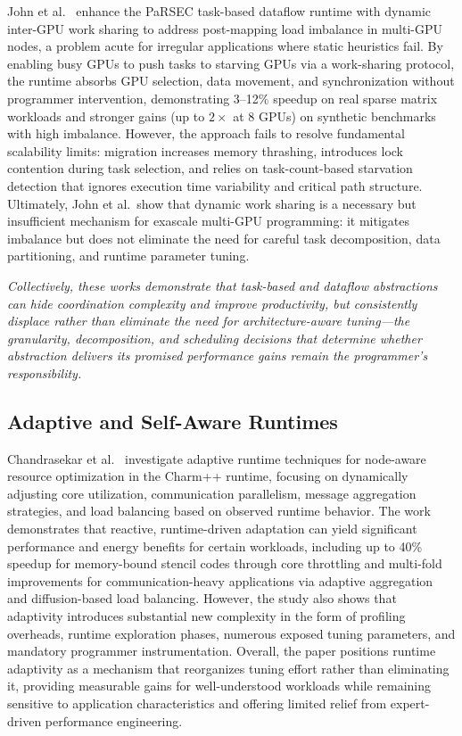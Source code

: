 John et al.~\cite{john2023multgpu} enhance the PaRSEC task-based dataflow
runtime with dynamic inter-GPU work sharing to address post-mapping load
imbalance in multi-GPU nodes, a problem acute for irregular applications where
static heuristics fail. By enabling busy GPUs to push tasks to starving GPUs
via a work-sharing protocol, the runtime absorbs GPU selection, data movement,
and synchronization without programmer intervention, demonstrating 3--12\%
speedup on real sparse matrix workloads and stronger gains (up to $2\times$ at
8 GPUs) on synthetic benchmarks with high imbalance. However, the approach
fails to resolve fundamental scalability limits: migration increases memory
thrashing, introduces lock contention during task selection, and relies on
task-count-based starvation detection that ignores execution time variability
and critical path structure. Ultimately, John et al.\ show that dynamic work
sharing is a necessary but insufficient mechanism for exascale multi-GPU
programming: it mitigates imbalance but does not eliminate the need for careful
task decomposition, data partitioning, and runtime parameter tuning.

\textit{Collectively, these works demonstrate that task-based and dataflow
abstractions can hide coordination complexity and improve productivity, but
consistently displace rather than eliminate the need for architecture-aware
tuning---the granularity, decomposition, and scheduling decisions that determine
whether abstraction delivers its promised performance gains remain the
programmer's responsibility.}

\subsection{Adaptive and Self-Aware Runtimes}

Chandrasekar et al.~\cite{chandrasekar2023adaptive} investigate adaptive runtime
techniques for node-aware resource optimization in the Charm++ runtime, focusing
on dynamically adjusting core utilization, communication parallelism, message
aggregation strategies, and load balancing based on observed runtime behavior.
The work demonstrates that reactive, runtime-driven adaptation can yield
significant performance and energy benefits for certain workloads, including up
to 40\% speedup for memory-bound stencil codes through core throttling and
multi-fold improvements for communication-heavy applications via adaptive
aggregation and diffusion-based load balancing. However, the study also shows
that adaptivity introduces substantial new complexity in the form of profiling
overheads, runtime exploration phases, numerous exposed tuning parameters, and
mandatory programmer instrumentation. Overall, the paper positions runtime
adaptivity as a mechanism that reorganizes tuning effort rather than eliminating
it, providing measurable gains for well-understood workloads while remaining
sensitive to application characteristics and offering limited relief from
expert-driven performance engineering.


